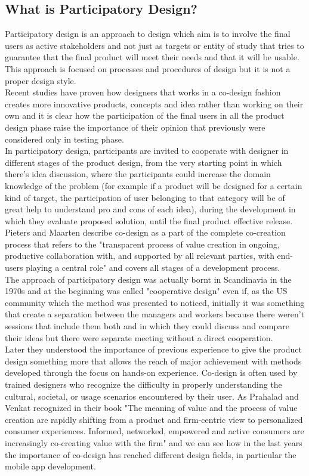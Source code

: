 \subsection{What is Participatory Design?}
Participatory design is an approach to design which aim is to involve the final users as active stakeholders and not just as targets or entity of study that tries to guarantee that the final product will meet their needs and that it will be usable. This approach is focused on processes and procedures of design but it is not a proper design style.\\
Recent studies \cite{Val} have proven how designers that works in a co-design fashion creates more innovative products, concepts and idea rather than working on their own and it is clear how the participation of the final users in all the product design phase raise the importance of their opinion that previously were considered only in testing phase. \\
In participatory design, participants are invited to cooperate with designer in different stages of the product design, from the very starting point in which there's idea discussion, where the participants could increase the domain knowledge of the problem (for example if a product will be designed for a certain kind of target, the participation of user belonging to that category will be of great help to understand pro and cons of each idea), during the development in which they evaluate proposed solution, until the final product effective release. Pieters and Maarten \cite{7Princ} describe co-design as a part of the complete co-creation process that refers to the "transparent process of value creation in ongoing, productive collaboration with, and supported by all relevant parties, with end-users playing a central role" and covers all stages of a development process.\\
The approach of participatory design was actually bornt in Scandinavia in the 1970s and at the beginning was called "cooperative design" even if, as the US community which the method was presented to noticed, initially it was something that create a separation between the managers and workers because there weren't sessions that include them both and in which they could discuss and compare their ideas but there were separate meeting without a direct cooperation.\\
Later they understood the importance of previous experience to give the product design something more that allows the reach of major achievement with methods developed through the focus on hands-on experience.
Co-design is often used by trained designers who recognize the difficulty in properly understanding the cultural, societal, or usage scenarios encountered by their user. As Prahalad and Venkat recognized in their book \cite{Cocreate} "The meaning of value and the process of value creation are rapidly shifting from a product and firm-centric view to personalized consumer experiences. Informed, networked, empowered and active consumers are increasingly co-creating value with the firm" and we can see how in the last years the importance of co-design has reached different design fields, in particular the mobile app development.

